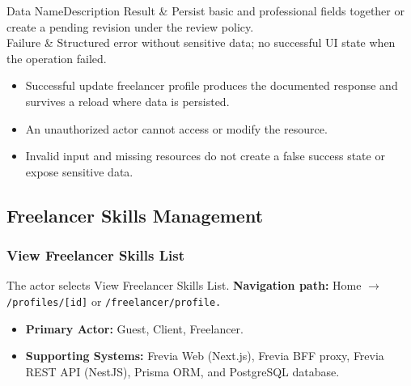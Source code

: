 \begin{specdatatable}{Data Name}{Description}
Result & Persist basic and professional fields together or create a pending revision under the review policy.\\ \hline
Failure & Structured error without sensitive data; no successful UI state when the operation failed.\\ \hline
\end{specdatatable}

\begin{itemize}[leftmargin=1.6em,topsep=3pt,itemsep=2pt,parsep=0pt,label=$\bullet$]
    \item Successful update freelancer profile produces the documented response and survives a reload where data is persisted.
    \item An unauthorized actor cannot access or modify the resource.
    \item Invalid input and missing resources do not create a false success state or expose sensitive data.
\end{itemize}


\subsection{Freelancer Skills Management}

\subsubsection{View Freelancer Skills List}

The actor selects View Freelancer Skills List.\newline
\textbf{Navigation path:} Home $\rightarrow$ \texttt{/\allowbreak{}profiles/\allowbreak{}[id]} or \texttt{/\allowbreak{}freelancer/\allowbreak{}profile.}


\begin{itemize}[leftmargin=1.6em,topsep=3pt,itemsep=2pt,parsep=0pt,label=$\bullet$]
    \item \textbf{Primary Actor:} Guest, Client, Freelancer.
    \item \textbf{Supporting Systems:} Frevia Web (Next.js), Frevia BFF proxy, Frevia REST API (NestJS), Prisma ORM, and PostgreSQL database.
\end{itemize}

